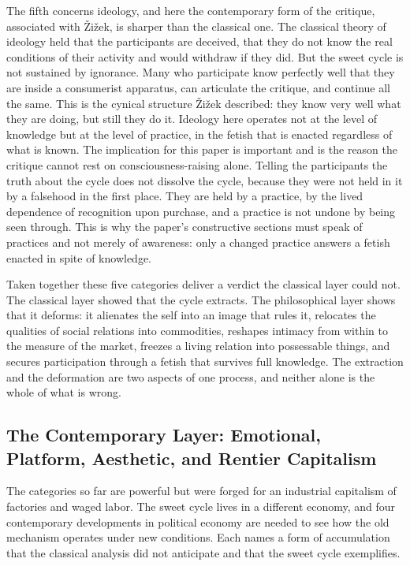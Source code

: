 The fifth concerns ideology, and here the contemporary form of the critique, associated with Žižek, is sharper than the classical one. The classical theory of ideology held that the participants are deceived, that they do not know the real conditions of their activity and would withdraw if they did. But the sweet cycle is not sustained by ignorance. Many who participate know perfectly well that they are inside a consumerist apparatus, can articulate the critique, and continue all the same. This is the cynical structure Žižek described: they know very well what they are doing, but still they do it. Ideology here operates not at the level of knowledge but at the level of practice, in the fetish that is enacted regardless of what is known. The implication for this paper is important and is the reason the critique cannot rest on consciousness-raising alone. Telling the participants the truth about the cycle does not dissolve the cycle, because they were not held in it by a falsehood in the first place. They are held by a practice, by the lived dependence of recognition upon purchase, and a practice is not undone by being seen through. This is why the paper's constructive sections must speak of practices and not merely of awareness: only a changed practice answers a fetish enacted in spite of knowledge.

Taken together these five categories deliver a verdict the classical layer could not. The classical layer showed that the cycle extracts. The philosophical layer shows that it deforms: it alienates the self into an image that rules it, relocates the qualities of social relations into commodities, reshapes intimacy from within to the measure of the market, freezes a living relation into possessable things, and secures participation through a fetish that survives full knowledge. The extraction and the deformation are two aspects of one process, and neither alone is the whole of what is wrong.

\subsection{The Contemporary Layer: Emotional, Platform, Aesthetic, and Rentier Capitalism}

The categories so far are powerful but were forged for an industrial capitalism of factories and waged labor. The sweet cycle lives in a different economy, and four contemporary developments in political economy are needed to see how the old mechanism operates under new conditions. Each names a form of accumulation that the classical analysis did not anticipate and that the sweet cycle exemplifies.

